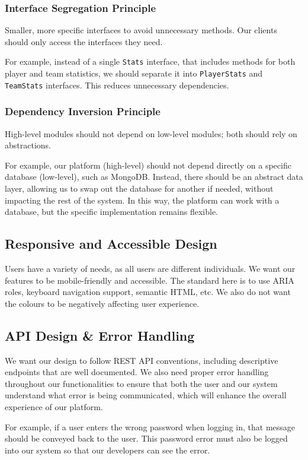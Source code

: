 \documentclass{article}
\begin{document}
\subsubsection*{Interface Segregation Principle}
Smaller, more specific interfaces to avoid unnecessary methods. Our clients should only access the interfaces they need. 

For example, instead of a single \texttt{Stats} interface, that includes methods for both player and team statistics, we should separate it into \texttt{PlayerStats} and \texttt{TeamStats} interfaces. This reduces unnecessary dependencies.

\subsubsection*{Dependency Inversion Principle}
High-level modules should not depend on low-level modules; both should rely on abstractions.

For example, our platform (high-level) should not depend directly on a specific database (low-level), such as MongoDB. Instead, there should be an abstract data layer, allowing us to swap out the database for another if needed, without impacting the rest of the system. In this way, the platform can work with a database, but the specific implementation remains flexible.

\subsection{Responsive and Accessible Design}
Users have a variety of needs, as all users are different individuals. We want our features to be mobile-friendly and accessible. The standard here is to use ARIA roles, keyboard navigation support, semantic HTML, etc. We also do not want the colours to be negatively affecting user experience.

\subsection{API Design \& Error Handling}
We want our design to follow REST API conventions, including descriptive endpoints that are well documented. We also need proper error handling throughout our functionalities to ensure that both the user and our system understand what error is being communicated, which will enhance the overall experience of our platform.

For example, if a user enters the wrong password when logging in, that message should be conveyed back to the user. This password error must also be logged into our system so that our developers can see the error.
\end{document}
